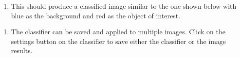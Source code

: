 \documentclass[letterpaper,10pt,english]{jupyterBook}
\begin{document}
\sphinxAtStartPar
{}
\begin{enumerate}
%
\setcounter{enumi}{3}
\item {} 
\sphinxAtStartPar
This should produce a classified image similar to the one shown below with blue as the background and red as the object of interest.

\end{enumerate}

\sphinxAtStartPar
{}
\begin{enumerate}
%
\setcounter{enumi}{4}
\item {} 
\sphinxAtStartPar
The classifier can be saved and applied to multiple images. Click on the settings button on the classifier to save either the classifier or the image results.

\end{enumerate}

\sphinxAtStartPar
{}

\sphinxstepscope
\end{document}
